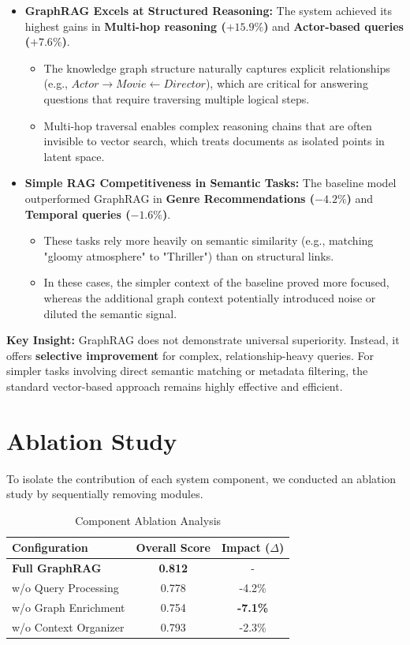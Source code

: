 \documentclass[a4paper, 12pt]{extreport}
\begin{document}
\begin{itemize}
    \item \textbf{GraphRAG Excels at Structured Reasoning:}
    The system achieved its highest gains in \textbf{Multi-hop reasoning ($+15.9\%$)} and \textbf{Actor-based queries ($+7.6\%$)}. 
    \begin{itemize}
        \item The knowledge graph structure naturally captures explicit relationships (e.g., $Actor \rightarrow Movie \leftarrow Director$), which are critical for answering questions that require traversing multiple logical steps.
        \item Multi-hop traversal enables complex reasoning chains that are often invisible to vector search, which treats documents as isolated points in latent space.
    \end{itemize}

    \item \textbf{Simple RAG Competitiveness in Semantic Tasks:}
    The baseline model outperformed GraphRAG in \textbf{Genre Recommendations ($-4.2\%$)} and \textbf{Temporal queries ($-1.6\%$)}.
    \begin{itemize}
        \item These tasks rely more heavily on semantic similarity (e.g., matching "gloomy atmosphere" to "Thriller") than on structural links.
        \item In these cases, the simpler context of the baseline proved more focused, whereas the additional graph context potentially introduced noise or diluted the semantic signal.
    \end{itemize}
\end{itemize}

\textbf{Key Insight:} GraphRAG does not demonstrate universal superiority. Instead, it offers \textbf{selective improvement} for complex, relationship-heavy queries. For simpler tasks involving direct semantic matching or metadata filtering, the standard vector-based approach remains highly effective and efficient.
\newpage 
\section{Ablation Study}
\label{sec:ablation}
To isolate the contribution of each system component, we conducted an ablation study by sequentially removing modules.

\begin{table}[h]
\centering
\caption{Component Ablation Analysis}
\label{tab:ablation}
\begin{tabular}{lcc}
\toprule
\textbf{Configuration} & \textbf{Overall Score} & \textbf{Impact ($\Delta$)} \\ \midrule
\textbf{Full GraphRAG} & \textbf{0.812} & - \\ 
w/o Query Processing & 0.778 & -4.2\% \\ 
w/o Graph Enrichment & 0.754 & \textbf{-7.1\%} \\ 
w/o Context Organizer & 0.793 & -2.3\% \\ \bottomrule
\end{tabular}
\end{table}
\end{document}
